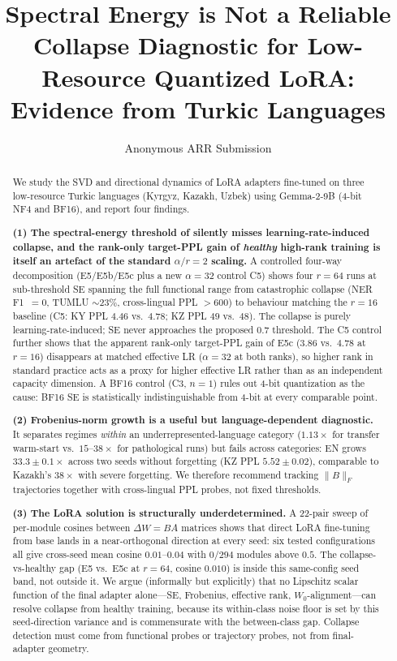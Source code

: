 \documentclass[11pt]{article}
\title{Spectral Energy is Not a Reliable Collapse Diagnostic for Low-Resource Quantized LoRA: Evidence from Turkic Languages}
\author{Anonymous ARR Submission}
\begin{document}
\maketitle

\begin{abstract}
We study the SVD and directional dynamics of LoRA adapters fine-tuned on three low-resource Turkic languages (Kyrgyz, Kazakh, Uzbek) using Gemma-2-9B (4-bit NF4 and BF16), and report four findings.

\textbf{(1) The spectral-energy threshold of \citet{biderman2024lora} silently misses learning-rate-induced collapse, and the rank-only target-PPL gain of \emph{healthy} high-rank training is itself an artefact of the standard $\alpha/r{=}2$ scaling.} A controlled four-way decomposition (E5/E5b/E5c plus a new $\alpha{=}32$ control C5) shows four $r{=}64$ runs at sub-threshold SE spanning the full functional range from catastrophic collapse (NER F1~$=0$, TUMLU $\sim 23\%$, cross-lingual PPL $>600$) to behaviour matching the $r{=}16$ baseline (C5: KY PPL $4.46$ vs.\ $4.78$; KZ PPL $49$ vs.\ $48$). The collapse is purely learning-rate-induced; SE never approaches the proposed $0.7$ threshold. The C5 control further shows that the apparent rank-only target-PPL gain of E5c ($3.86$ vs.\ $4.78$ at $r{=}16$) disappears at matched effective LR ($\alpha{=}32$ at both ranks), so higher rank in standard practice acts as a proxy for higher effective LR rather than as an independent capacity dimension. A BF16 control (C3, $n{=}1$) rules out 4-bit quantization as the cause: BF16 SE is statistically indistinguishable from 4-bit at every comparable point.

\textbf{(2) Frobenius-norm growth is a useful but language-dependent diagnostic.} It separates regimes \emph{within} an underrepresented-language category ($1.13\times$ for transfer warm-start vs.\ $15$--$38\times$ for pathological runs) but fails across categories: EN grows $33.3 \pm 0.1\times$ across two seeds without forgetting (KZ PPL $5.52 \pm 0.02$), comparable to Kazakh's $38\times$ with severe forgetting. We therefore recommend tracking $\|B\|_F$ trajectories together with cross-lingual PPL probes, not fixed thresholds.

\textbf{(3) The LoRA solution is structurally underdetermined.} A 22-pair sweep of per-module cosines between $\Delta W{=}BA$ matrices shows that direct LoRA fine-tuning from base lands in a near-orthogonal direction at every seed: six tested configurations all give cross-seed mean cosine $0.01$--$0.04$ with $0/294$ modules above $0.5$. The collapse-vs-healthy gap (E5 vs.\ E5c at $r{=}64$, cosine $0.010$) is inside this same-config seed band, not outside it. We argue (informally but explicitly) that no Lipschitz scalar function of the final adapter alone---SE, Frobenius, effective rank, $W_0$-alignment---can resolve collapse from healthy training, because its within-class noise floor is set by this seed-direction variance and is commensurate with the between-class gap. Collapse detection must come from functional probes or trajectory probes, not from final-adapter geometry.


\end{abstract}
\end{document}
